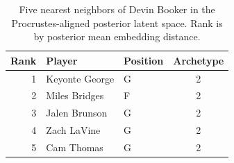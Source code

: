\begin{table}[htbp]
  \centering\small
  \begin{tabular}{rllc}
    \toprule
    Rank & Player & Position & Archetype \\
    \midrule
    1 & Keyonte George & G & 2 \\
    2 & Miles Bridges & F & 2 \\
    3 & Jalen Brunson & G & 2 \\
    4 & Zach LaVine & G & 2 \\
    5 & Cam Thomas & G & 2 \\
    \bottomrule
  \end{tabular}
  \caption{Five nearest neighbors of Devin Booker in the Procrustes-aligned posterior latent space. Rank is by posterior mean embedding distance.}
  \label{tab:Devin_Booker_neighbors}
\end{table}

